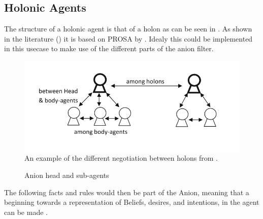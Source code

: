 \subsection{Holonic Agents}

The structure of a holonic agent is that of a holon as can be seen in . As shown in the literature () it is based on PROSA by \citep{van1998reference}. Idealy this could be implemented in this usecase to make use of the different parts of the anion filter.
\begin{figure}[h]
	\centering
	\includegraphics[width=0.7\linewidth]{img/holon_example}
	\caption{An example of the different negotiation between holons from \citet{beheshti2016negotiations}.}
	\label{fig:holonexample}
\end{figure}


\begin{figure}[h]
	
	\centering
	\caption{Anion head and sub-agents}
	\label{fig:anion-head-sub}
	
\end{figure}

The following facts and rules would then be part of the Anion, meaning that a beginning towards a representation of Beliefs, desires, and intentions, in the agent can be made \citep{rao1995bdi}.


